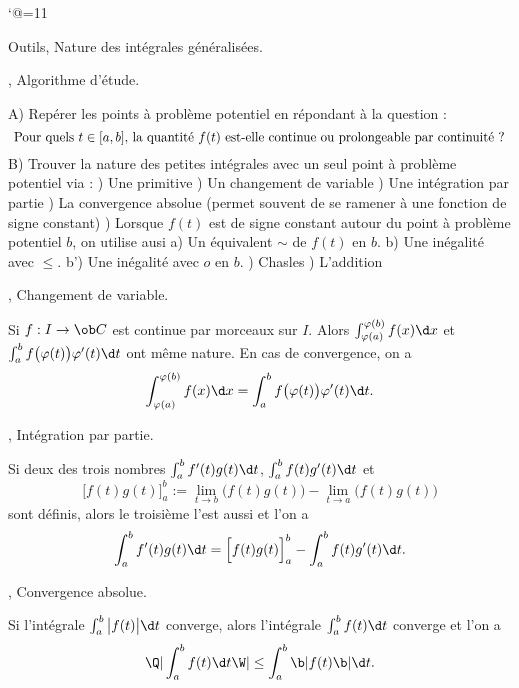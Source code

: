 \catcode`@=11\relax



\vglue-10mm


\Chapter Outils, Nature des intégrales généralisées.

, Algorithme d'étude.

%
\noindent A) Repérer les points à problème potentiel en répondant à la question : 
$$\hbox{
Pour quels $t\in[a,b]$, la quantité $f(t)$ est-elle continue ou prolongeable par continuité ? 
}
$$
B) Trouver la nature des petites intégrales avec un seul point à problème potentiel via : 
\PAR{}) Une primitive
\PAR{}) Un changement de variable
\PAR{}) Une intégration par partie
\PAR{}) La convergence absolue (permet souvent de se ramener à une fonction de signe constant)
\PAR{}) Lorsque $f(t)$ est de signe constant autour du point à problème potentiel $b$, on utilise ausi 
\PAR
a) Un équivalent $\sim$ de $f(t)$ en $b$.
\PAR
b) Une inégalité avec $\le$. 
\PAR
b') Une inégalité avec $o$ en $b$.
\PAR{}) Chasles
\PAR{}) L'addition

, Changement de variable.

\medskip
{}
Si $f:I\to\ob C$ est continue par morceaux sur $I$. 
Alors $\int_{\varphi(a)}^{\varphi(b)}f(x)\d x$ et $\int_a^bf\big(\varphi(t)\big)\varphi'(t)\d t$ 
ont même nature. En cas de convergence, on a 
$$
\int_{\varphi(a)}^{\varphi(b)}f(x)\d x=\int_a^bf\big(\varphi(t)\big)\varphi'(t)\d t.
$$

, Intégration par partie.

\medskip
{} 
Si deux des trois nombres $\int_a^bf'(t)g(t)\d t$, $\int_a^bf(t)g'(t)\d t$ et 
$$
\Big[f(t)g(t)\Big]_a^b:=\lim\limits_{t\to b}\Big(f(t)g(t)\Big)-\lim\limits_{t\to a}\Big(f(t)g(t)\Big)
$$
sont définis, alors le troisième l'est aussi et l'on a 
$$
\int_a^bf'(t)g(t)\d t=\Big[f(t)g(t)\Big]_a^b-\int_a^bf(t)g'(t)\d t. 
$$

, Convergence absolue.

\medskip
{}
Si l'intégrale $\int_a^b\big|f(t)\big|\d t$ converge, alors l'intégrale $\int_a^bf(t)\d t$ converge et l'on a 
$$
\Q|\int_a^bf(t)\d t\W|\le \int_a^b\b|f(t)\b|\d t. 
$$


